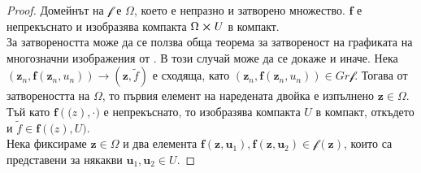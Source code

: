 \begin{proof}

  Домейнът на $\mathscr{f}$ е $\Omega$, което е непразно и затворено множество. $\mathbf{f}$ е непрекъснато и изобразява компакта $\Omega \cross U$ в компакт. \\
  За затвореността може да се ползва обща теорема за затвореност на графиката на многозначни изображения от \cite[теорема~17.11]{Aliprantis2006}.
  В този случай може да се докаже и иначе.
  Нека $(\mathbf{z}_n, \mathbf{f}(\mathbf{z}_n, u_n)) \rightarrow (\mathbf{z}, \tilde{f})$ е сходяща, като $(\mathbf{z}_n, \mathbf{f}(\mathbf{z}_n, u_n)) \in Gr \mathscr{f}$.
  Тогава от затвореността на $\Omega$, то първия елемент на наредената двойка е изпълнено $\mathbf{z} \in \Omega$.
  Тъй като $\mathbf{f}(\mathbf(z), \cdot)$ е непрекъснато, то изобразява компакта $U$ в компакт, откъдето и $\tilde{f} \in \mathbf{f}(\mathbf(z), U)$. \\
  Нека фиксираме $\mathbf{z} \in \Omega$ и два елемента $\mathbf{f}(\mathbf{z}, \mathbf{u}_1), \mathbf{f}(\mathbf{z}, \mathbf{u}_2) \in \mathscr{f}(\mathbf{z})$, които са представени за някакви $\mathbf{u}_1, \mathbf{u}_2 \in U$.

\end{proof}
